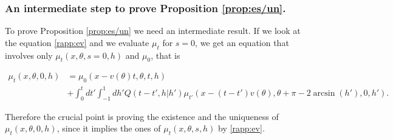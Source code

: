 \documentclass[a4paper,10pt,reqno]{amsart}
\numberwithin{equation}{subsection}
\numberwithin{figure}{subsection}
\begin{document}
\subsubsection{An intermediate step to prove Proposition \ref{prop:es/un}.}
To prove Proposition \ref{prop:es/un} we need an intermediate result. If we look at the equation \eqref{rapp:ev} and we evaluate $\mu_t$ for $s=0$, we get an equation that involves only $\mu_t(x,\theta,s=0,h)$ and $\mu_0$, that is

{\small\begin{align*}
\mu_t(x,\theta,0,h)&=\mu_0(x-v(\theta)t,\theta,t,h)
\\
&+\int_0^tdt'\int_{-1}^1dh'Q(t-t',h|h')\mu_{t'}(x-(t-t')v(\theta),\theta+\pi-2\arcsin(h'),0,h').
\end{align*}}

Therefore the crucial point is proving the existence and the uniqueness of $\mu_t(x,\theta,0,h)$, since it implies the ones of $\mu_t(x,\theta,s,h)$ by \eqref{rapp:ev}.
\end{document}
